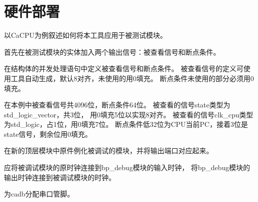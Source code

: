 \section{硬件部署}
    以CaCPU为例叙述如何将本工具应用于被测试模块。

    首先在被测试模块的实体加入两个输出信号：被查看信号和断点条件。

    

    在结构体的并发处理语句中定义被查看信号和断点条件。%
    被查看信号的定义可使用工具自动生成，默认8对齐，未使用的用0填充。%
    断点条件未使用的部分必须用0填充。

    在本例中被查看信号共4096位，断点条件64位。%
    被查看的信号state类型为std\_logic\_vector，共3位，%
    用0填充5位以实现8对齐。%
    被查看的信号clk\_cpu类型为std\_logic，占1位，用0填充7位。%
    断点条件低32位为CPU当前PC，接着3位是state信号，剩余位用0填充。

    
    
    在新的顶层模块中原件例化被调试的模块，并将输出端口对应起来。

    

    应将被调试模块的原时钟连接到bp\_debug模块的输入时钟，%
    将bp\_debug模块的输出时钟连接到被调试模块的时钟。

    为cadb分配串口管脚。
